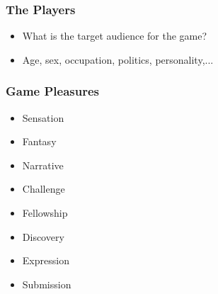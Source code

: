 \documentclass{beamer}
\begin{document}
\begin{frame}
  \frametitle{The Players}

\begin{itemize}
  \item What is the target audience for the game?
\item Age, sex, occupation, politics, personality,...\pause
{}
\end{itemize}




\end{frame}

\begin{frame}
  \frametitle{Game Pleasures}

\begin{itemize}
  \item Sensation
\item Fantasy
\item Narrative
\item Challenge
\item Fellowship
\item Discovery
\item Expression
\item Submission
\end{itemize}



\end{frame}
\end{document}
